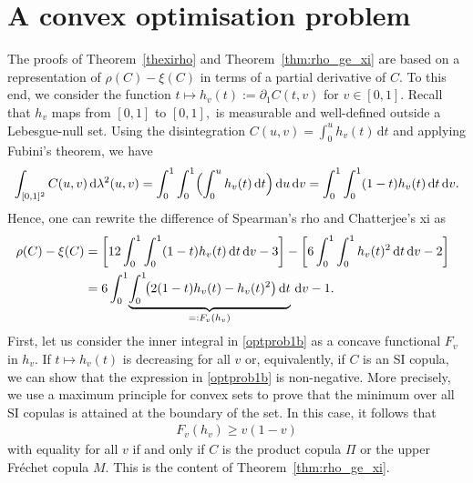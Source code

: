 \documentclass{article}
\theoremstyle{plain}
\theoremstyle{definition}
\newcommand{\de}{\mathrm{\,d}}
\begin{document}
\section{A convex optimisation problem}
\label{sec3}

The proofs of Theorem~\ref{thexirho} and Theorem~\ref{thm:rho_ge_xi} are based on a representation of \(\rho(C) - \xi(C)\) in terms of a partial derivative of \(C.\)
To this end, we consider the function $t \mapsto h_v(t):=\partial_1 C(t,v)$ for \(v\in [0,1].\)
Recall that \(h_v\) maps from \([0,1]\) to \([0,1],\) is measurable and well-defined outside a Lebesgue-null set.
Using the disintegration $C(u,v)=\int_0^u h_v(t)\de t$ and applying Fubini's theorem, we have
\begin{align}\label{reprho2}
\int_{[0,1]^2}C(u,v)\de \lambda^2(u,v)
=\int_{0}^{1}\int_{0}^{1}\Bigl(\int_{0}^{u}h_v(t)\de t\Bigr)\de u \de v
=\int_{0}^{1}\int_{0}^{1}(1-t)h_v(t)\de t \de v.
\end{align}
Hence, one can rewrite the difference of Spearman's rho and Chatterjee's xi as
\begin{align}
 \label{optprob1a}
  \hspace{-.23cm}  \rho(C)-\xi(C) &= \left[12 \int_0^1\int_0^1 (1-t) h_v(t) \de t \de v - 3\right]  -\left[6\int_0^1\int_0^1 h_v(t)^2 \de t \de v - 2\right]\\
 \label{optprob1b} &= 
  6 \int_{0}^{1}\!\underbrace{\int_{0}^{1}\!\bigl(2(1-t)h_v(t)-h_v(t)^2\bigr)\de t}
    _{=:F_v(h_v)}\de v-1 .
\end{align}
First, let us consider the inner integral in \eqref{optprob1b} as a concave functional \(F_v\) in \(h_v.\) If \(t \mapsto h_v(t)\) is decreasing for all \(v\) or, equivalently, if \(C\) is an SI copula, we can show that the expression in \eqref{optprob1b} is non-negative. More precisely, we use a maximum principle for convex sets to prove that the minimum over all SI copulas is attained at the boundary of the set.
In this case, it follows that
\begin{align}
    F_v(h_v)\geq v(1-v)
\end{align}
with equality for all \(v\) if and only if \(C\) is the product copula \(\Pi\) or the upper Fr\'{e}chet copula \(M.\) This is the content of Theorem~\ref{thm:rho_ge_xi}.
\end{document}

